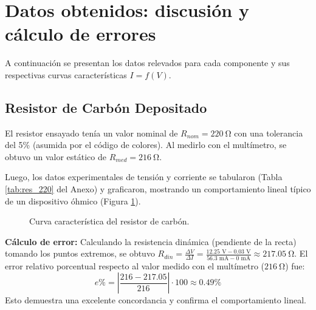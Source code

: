 \section{Datos obtenidos: discusión y cálculo de errores}

A continuación se presentan los datos relevados para cada componente y sus respectivas curvas características $I=f(V)$. 

\subsection{Resistor de Carbón Depositado}

El resistor ensayado tenía un valor nominal de $R_{nom} = \SI{220}{\ohm}$ con una tolerancia del 5\% (asumida por el código de colores). Al medirlo con el multímetro, se obtuvo un valor estático de $R_{med} = \SI{216}{\ohm}$.

Luego, los datos experimentales de tensión y corriente se tabularon (Tabla \ref{tab:res_220} del Anexo) y graficaron, mostrando un comportamiento lineal típico de un dispositivo óhmico (Figura \ref{fig:curva_resistor}).


\begin{figure}[H]
    \centering
    \caption{Curva característica del resistor de carbón.}
    \label{fig:curva_resistor}
\end{figure}

\textbf{Cálculo de error:}
Calculando la resistencia dinámica (pendiente de la recta) tomando los puntos extremos, se obtuvo $R_{din} = \frac{\Delta V}{\Delta I} = \frac{12.25\text{ V} - 0.03\text{ V}}{56.3\text{ mA} - 0\text{ mA}} \approx \SI{217.05}{\ohm}$. 
El error relativo porcentual respecto al valor medido con el multímetro ($\SI{216}{\ohm}$) fue:
\begin{equation}
    e\% = \left| \frac{216 - 217.05}{216} \right| \cdot 100 \approx 0.49\%
\end{equation}
Esto demuestra una excelente concordancia y confirma el comportamiento lineal.

